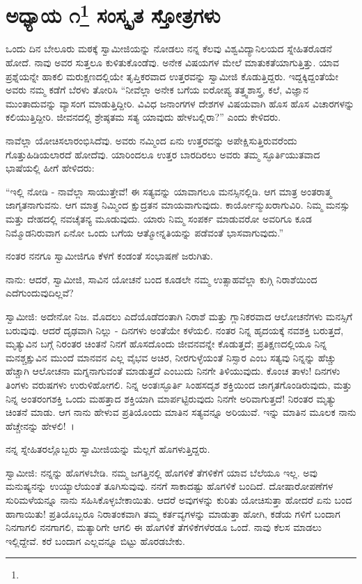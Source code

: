 
\chapter[ಅಧ್ಯಾಯ ೧]{ಅಧ್ಯಾಯ ೧\protect\footnote{} ಸಂಸ್ಕೃತ ಸ್ತೋತ್ರಗಳು}

ಒಂದು ದಿನ ಬೇಲೂರು ಮಠಕ್ಕೆ ಸ್ವಾಮೀಜಿಯನ್ನು ನೋಡಲು ನನ್ನ ಕೆಲವು ವಿಶ್ವವಿದ್ಯಾನಿಲಯದ ಸ್ನೇಹಿತರೊಡನೆ ಹೋದೆ. ನಾವು ಅವರ ಸುತ್ತಲೂ ಕುಳಿತುಕೊಂಡೆವು. ಅನೇಕ ವಿಷಯಗಳ ಮೇಲೆ ಮಾತುಕತೆಯಾಗುತ್ತಿತ್ತು. ಯಾವ ಪ್ರಶ್ನೆಯನ್ನೇ ಹಾಕಲಿ ಮರುಕ್ಷಣದಲ್ಲಿಯೇ ತೃಪ್ತಿಕರವಾದ ಉತ್ತರವನ್ನು ಸ್ವಾಮೀಜಿ ಕೊಡುತ್ತಿದ್ದರು. ಇದ್ದಕ್ಕಿದ್ದಂತೆಯೇ ಅವರು ನಮ್ಮ ಕಡೆಗೆ ಬೆರಳು ತೋರಿಸಿ “ನೀವೆಲ್ಲಾ ಅನೇಕ ಬಗೆಯ ಐರೋಪ್ಯ ತತ್ತ್ವಶಾಸ್ತ್ರ, ಕಲೆ, ವಿಜ್ಞಾನ ಮುಂತಾದುವನ್ನು ವ್ಯಾಸಂಗ ಮಾಡುತ್ತಿದ್ದೀರಿ. ವಿವಿಧ ಜನಾಂಗಗಳ ದೇಶಗಳ ವಿಷಯವಾಗಿ ಹೊಸ ಹೊಸ ವಿಚಾರಗಳನ್ನು ಕಲಿಯುತ್ತಿದ್ದೀರಿ. ಜೀವನದಲ್ಲಿ ಶ್ರೇಷ್ಠತಮ ಸತ್ಯ ಯಾವುದು ಹೇಳಬಲ್ಲಿರಾ?” ಎಂದು ಕೇಳಿದರು.

ನಾವೆಲ್ಲಾ ಯೋಚಿಸಲಾರಂಭಿಸಿದೆವು. ಅವರು ನಮ್ಮಿಂದ ಏನು ಉತ್ತರವನ್ನು ಅಪೇಕ್ಷಿಸುತ್ತಿರುವರೆಂದು ಗೊತ್ತುಹಿಡಿಯಲಾರದೆ ಹೋದೆವು. ಯಾರಿಂದಲೂ ಉತ್ತರ ಬಾರದಿರಲು ಅವರು ತಮ್ಮ ಸ್ಫೂರ್ತಿಯುತವಾದ ಭಾಷೆಯಲ್ಲಿ ಹೀಗೆ ಹೇಳಿದರು:

“ಇಲ್ಲಿ ನೋಡಿ - ನಾವೆಲ್ಲಾ ಸಾಯುತ್ತೇವೆ! ಈ ಸತ್ಯವನ್ನು ಯಾವಾಗಲೂ ಮನಸ್ಸಿನಲ್ಲಿಡಿ. ಆಗ ಮಾತ್ರ ಅಂತರಾತ್ಮ ಜಾಗೃತನಾಗುವನು. ಆಗ ಮಾತ್ರ ನಿಮ್ಮಿಂದ ಕ್ಷುದ್ರತನ ಮಾಯವಾಗುವುದು. ಕಾರ್ಯೋನ್ಮುಖರಾಗುವಿರಿ. ನಿಮ್ಮ ಮನಸ್ಸು ಮತ್ತು ದೇಹದಲ್ಲಿ ನವಚೈತನ್ಯ ಮೂಡುವುದು. ಯಾರು ನಿಮ್ಮ ಸಂಪರ್ಕ ಮಾಡುವರೋ ಅವರಿಗೂ ಕೂಡ ನಿಮ್ಮೊಡನಿರುವಾಗ ಏನೋ ಒಂದು ಬಗೆಯ ಆತ್ಮೋನ್ನತಿಯನ್ನು ಪಡೆವಂತೆ ಭಾಸವಾಗುವುದು.”

ನಂತರ ನನಗೂ ಸ್ವಾಮೀಜಿಗೂ ಕೆಳಗೆ ಕಂಡಂತೆ ಸಂಭಾಷಣೆ ಜರುಗಿತು.

ನಾನು: ಆದರೆ, ಸ್ವಾಮೀಜಿ, ಸಾವಿನ ಯೋಚನೆ ಬಂದ ಕೂಡಲೇ ನಮ್ಮ ಉತ್ಸಾಹವೆಲ್ಲಾ ಕುಗ್ಗಿ ನಿರಾಶೆಯಿಂದ ಎದೆಗುಂದುವುದಿಲ್ಲವೆ?

ಸ್ವಾಮೀಜಿ: ಅದೇನೋ ನಿಜ. ಮೊದಲು ಎದೆಯೊಡೆದಂತಾಗಿ ನಿರಾಶೆ ಮತ್ತು ಗ್ಲಾನಿಕರವಾದ ಆಲೋಚನೆಗಳು ಮನಸ್ಸಿಗೆ ಬರುವುವು. ಆದರೆ ದೃಢವಾಗಿ ನಿಲ್ಲು - ದಿನಗಳು ಅಂತೆಯೇ ಕಳೆಯಲಿ. ನಂತರ ನಿನ್ನ ಹೃದಯಕ್ಕೆ ನವಶಕ್ತಿ ಬರುತ್ತದೆ, ಮೃತ್ಯುವಿನ ಬಗ್ಗೆ ನಿರಂತರ ಚಿಂತನೆ ನಿನಗೆ ಹೊಸದೊಂದು ಜೀವನವನ್ನೇ ಕೊಡುತ್ತದೆ; ಪ್ರತಿಕ್ಷಣದಲ್ಲಿಯೂ ನಿನ್ನ ಮನಶ್ಚಕ್ಷುವಿನ ಮುಂದೆ ಮಾನವನ ಎಲ್ಲ ವೈಭವ ಅಚಿರ, ನೀರಗುಳ್ಳೆಯಂತೆ ನಿಸ್ಸಾರ ಎಂಬ ಸತ್ಯವು ನಿನ್ನನ್ನು ಹೆಚ್ಚು ಹೆಚ್ಚಾಗಿ ಆಲೋಚನಾ ಮಗ್ನನಾಗುವಂತೆ ಮಾಡುತ್ತದೆ ಎಂಬುದು ನಿನಗೇ ತಿಳಿಯುವುದು. ಕೊಂಚ ತಾಳು! ದಿನಗಳು ತಿಂಗಳು ವರುಷಗಳು ಉರುಳಿಹೋಗಲಿ. ನಿನ್ನ ಅಂತಃಸ್ಫೂರ್ತಿ ಸಿಂಹಸದೃಶ ಶಕ್ತಿಯಿಂದ ಜಾಗೃತಗೊಂಡಿರುವುದು, ಮತ್ತು ನಿನ್ನ ಅಂತರಂಗಶಕ್ತಿ ಒಂದು ಮಹತ್ತಾದ ಶಕ್ತಿಯಾಗಿ ಮಾರ್ಪಟ್ಟಿರುವುದು ನಿನಗೇ ಅರಿವಾಗುತ್ತದೆ! ನಿರಂತರ ಮೃತ್ಯು ಚಿಂತನೆ ಮಾಡು. ಆಗ ನಾನು ಹೇಳುವ ಪ್ರತಿಯೊಂದು ಮಾತಿನ ಸತ್ಯವನ್ನೂ ಅರಿಯುವೆ. ಇನ್ನು ಮಾತಿನ ಮೂಲಕ ನಾನು ಹೆಚ್ಚೇನನ್ನು ಹೇಳಲಿ!~।

ನನ್ನ ಸ್ನೇಹಿತರಲ್ಲೊಬ್ಬರು ಸ್ವಾಮೀಜಿಯನ್ನು ಮೆಲ್ಲಗೆ ಹೊಗಳುತ್ತಿದ್ದರು.

ಸ್ವಾಮೀಜಿ: ನನ್ನನ್ನು ಹೊಗಳಬೇಡಿ. ನಮ್ಮ ಜಗತ್ತಿನಲ್ಲಿ ಹೊಗಳಿಕೆ ತೆಗಳಿಕೆಗೆ ಯಾವ ಬೆಲೆಯೂ ಇಲ್ಲ. ಅವು ಮನುಷ್ಯನನ್ನು ಉಯ್ಯಾಲೆಯಂತೆ ತೂಗಿಸುವುವು. ನನಗೆ ಸಾಕಾದಷ್ಟು ಹೊಗಳಿಕೆ ಬಂದಿದೆ. ದೋಷಾರೋಪಣೆಗಳ ಸುರಿಮಳೆಯನ್ನೂ ನಾನು ಸಹಿಸಿಕೊಳ್ಳಬೇಕಾಯಿತು. ಆದರೆ ಅವುಗಳನ್ನು ಕುರಿತು ಯೋಚಿಸುತ್ತಾ ಹೋದರೆ ಏನು ಬಂದ ಹಾಗಾಯಿತು! ಪ್ರತಿಯೊಬ್ಬರೂ ನಿರಾತಂಕವಾಗಿ ತಮ್ಮ ಕರ್ತವ್ಯಗಳನ್ನು ಮಾಡುತ್ತಾ ಹೋಗಿ, ಕಡೆಯ ಗಳಿಗೆ ಬಂದಾಗ ನಿನಗಾಗಲಿ ನನಗಾಗಲಿ, ಮತ್ಯಾರಿಗೇ ಆಗಲಿ ಈ ಹೊಗಳಿಕೆ ತೆಗಳಿಕೆಗಳೆರಡೂ ಒಂದೆ. ನಾವು ಕೆಲಸ ಮಾಡಲು ಇಲ್ಲಿದ್ದೇವೆ. ಕರೆ ಬಂದಾಗ ಎಲ್ಲವನ್ನೂ ಬಿಟ್ಟು ಹೊರಡಬೇಕು.

